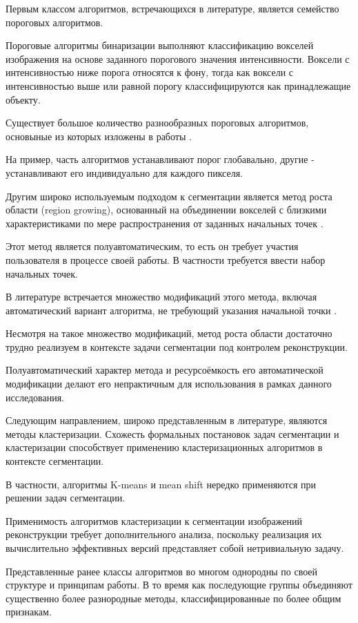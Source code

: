 Первым классом алгоритмов, встречающихся в литературе, является семейство пороговых алгоритмов. 

Пороговые алгоритмы бинаризации выполняют классификацию вокселей изображения на основе заданного порогового значения интенсивности. Воксели с интенсивностью ниже порога относятся к фону, тогда как воксели с интенсивностью выше или равной порогу классифицируются как принадлежащие объекту.

Существует большое количество разнообразных пороговых алгоритмов, основыные из которых изложены в работы \cite{wirjadi2007survey}. 

На пример, часть алгоритмов устанавливают порог глобавально, другие - устанавливают его индивидуально для каждого пикселя. 

Другим широко используемым подходом к сегментации является метод роста области (region growing), основанный на объединении вокселей с близкими характеристиками по мере распространения от заданных начальных точек \cite{adams1994seeded}.

Этот метод является полуавтоматическим, то есть он требует участия пользователя в процессе своей работы. В частности требуется ввести набор начальных точек.

В литературе встречается множество модификаций этого метода, включая автоматический вариант алгоритма, не требующий указания начальной точки \cite{lin2000unseeded}. 

Несмотря на такое множество модификаций, метод роста области достаточно трудно реализуем в контексте задачи сегментации под контролем реконструкции.

Полуавтоматический характер метода и ресурсоёмкость его автоматической модификации делают его непрактичным для использования в рамках данного исследования.

Следующим направлением, широко представленным в литературе, являются методы кластеризации. Схожесть формальных постановок задач сегментации и кластеризации способствует применению кластеризационных алгоритмов в контексте сегментации.

В частности, алгоритмы K-means \cite{sarker2017segmentation} и mean shift \cite{comaniciu2002mean} нередко применяются при решении задач сегментации.

Применимость алгоритмов кластеризации к сегментации изображений реконструкции требует дополнительного анализа, поскольку реализация их вычислительно эффективных версий представляет собой нетривиальную задачу.

Представленные ранее классы алгоритмов во многом однородны по своей структуре и принципам работы. В то время как последующие группы объединяют существенно более разнородные методы, классифицированные по более общим признакам.

